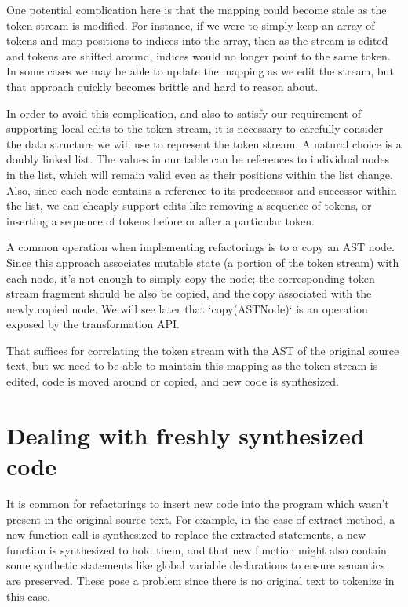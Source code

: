 One potential complication here is that the mapping could become stale as the
token stream is modified. For instance, if we were to simply keep an array of
tokens and map positions to indices into the array, then as the stream is
edited and tokens are shifted around, indices would no longer point to the same
token. In some cases we may be able to update the mapping as we edit the
stream, but that approach quickly becomes brittle and hard to reason about.

In order to avoid this complication, and also to satisfy our requirement of
supporting local edits to the token stream, it is necessary to carefully
consider the data structure we will use to represent the token stream. A
natural choice is a doubly linked list. The values in our table can be
references to individual nodes in the list, which will remain valid even as
their positions within the list change. Also, since each node contains a
reference to its predecessor and successor within the list, we can cheaply
support edits like removing a sequence of tokens, or inserting a sequence of
tokens before or after a particular token.

A common operation when implementing refactorings is to a copy an AST
node. Since this approach associates mutable state (a portion of the token
stream) with each node, it's not enough to simply copy the node; the
corresponding token stream fragment should be also be copied, and the copy
associated with the newly copied node. We will see later that `copy(ASTNode)`
is an operation exposed by the transformation API.

That suffices for correlating the token stream with the AST of the original
source text, but we need to be able to maintain this mapping as the token
stream is edited, code is moved around or copied, and new code is synthesized.

\section{Dealing with freshly synthesized code}

It is common for refactorings to insert new code into the program which wasn't
present in the original source text. For example, in the case of extract
method, a new function call is synthesized to replace the extracted statements,
a new function is synthesized to hold them, and that new function might also
contain some synthetic statements like global variable declarations to ensure
semantics are preserved. These pose a problem since there is no original text
to tokenize in this case.

